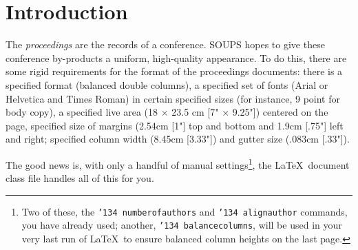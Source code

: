 \documentclass[twoside,letterpaper]{soups}
\begin{document}
\maketitle
\begin{abstract}
This paper provides a sample of a \LaTeX\ document which conforms,
somewhat loosely, to the formatting guidelines for
ACM SIG Proceedings. It is an {\em alternate} style which produces
a {\em tighter-looking} paper and was designed in response to
concerns expressed, by authors, over page-budgets.
It complements the document \textit{Author's (Alternate) Guide to
Preparing ACM SIG Proceedings Using \LaTeX$2_\epsilon$\ and Bib\TeX}.
This source file has been written with the intention of being
compiled under \LaTeX$2_\epsilon$\ and BibTeX.

The developers have tried to include every imaginable sort
of ``bells and whistles," such as a subtitle, footnotes on
title, subtitle and authors, as well as in the text, and
every optional component (e.g. Acknowledgments, Additional
Authors, Appendices), not to mention examples of
equations, theorems, tables and figures.

To make best use of this sample document, run it through \LaTeX\
and BibTeX, and compare this source code with the printed
output produced by the dvi file. A compiled PDF version
is available on the web page to help you with the
`look and feel'.
\end{abstract}


\section{Introduction}
The \textit{proceedings} are the records of a conference.
SOUPS hopes to give these conference by-products a uniform,
high-quality appearance.  To do this, there are some rigid
requirements for the format of the proceedings documents: there
is a specified format (balanced  double columns), a specified
set of fonts (Arial or Helvetica and Times Roman) in
certain specified sizes (for instance, 9 point for body copy),
a specified live area (18 $\times$ 23.5 cm [7" $\times$ 9.25"]) centered on
the page, specified size of margins (2.54cm [1"] top and
bottom and 1.9cm [.75"] left and right; specified column width
(8.45cm [3.33"]) and gutter size (.083cm [.33"]).

The good news is, with only a handful of manual
settings\footnote{Two of these, the {\texttt{\char'134 numberofauthors}}
and {\texttt{\char'134 alignauthor}} commands, you have
already used; another, {\texttt{\char'134 balancecolumns}}, will
be used in your very last run of \LaTeX\ to ensure
balanced column heights on the last page.}, the \LaTeX\ document
class file handles all of this for you.
\end{document}
